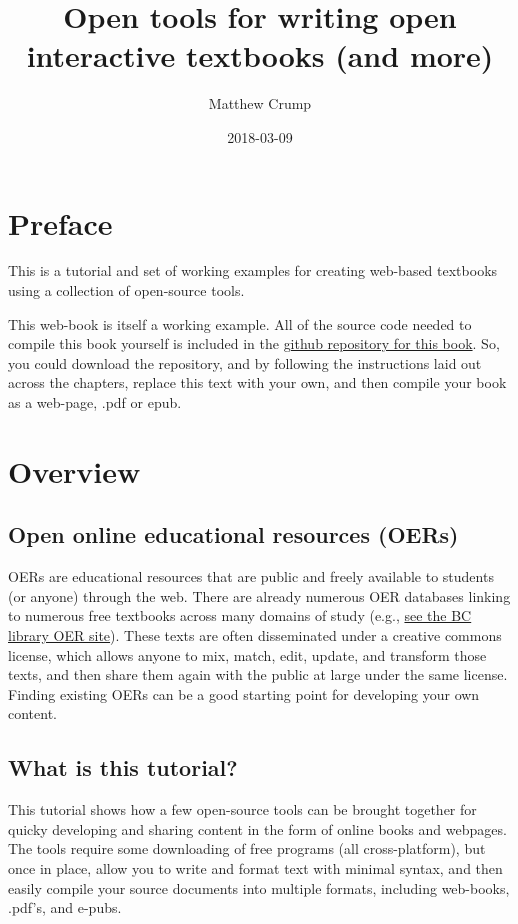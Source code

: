 \documentclass[]{book}
\title{Open tools for writing open interactive textbooks (and more)}
\author{Matthew Crump}
\date{2018-03-09}
\theoremstyle{definition}
\theoremstyle{definition}
\theoremstyle{definition}
\theoremstyle{remark}
\begin{document}
\maketitle

{
\setcounter{tocdepth}{1}
\tableofcontents
}
\chapter*{Preface}\label{preface}

This is a tutorial and set of working examples for creating web-based
textbooks using a collection of open-source tools.

This web-book is itself a working example. All of the source code needed
to compile this book yourself is included in the
\href{https://github.com/CrumpLab/OER_bookdown}{github repository for
this book}. So, you could download the repository, and by following the
instructions laid out across the chapters, replace this text with your
own, and then compile your book as a web-page, .pdf or epub.

\chapter{Overview}\label{overview}

\section{Open online educational resources
(OERs)}\label{open-online-educational-resources-oers}

OERs are educational resources that are public and freely available to
students (or anyone) through the web. There are already numerous OER
databases linking to numerous free textbooks across many domains of
study (e.g., \href{http://libguides.brooklyn.cuny.edu/research/oer}{see
the BC library OER site}). These texts are often disseminated under a
creative commons license, which allows anyone to mix, match, edit,
update, and transform those texts, and then share them again with the
public at large under the same license. Finding existing OERs can be a
good starting point for developing your own content.

\section{What is this tutorial?}\label{what-is-this-tutorial}

This tutorial shows how a few open-source tools can be brought together
for quicky developing and sharing content in the form of online books
and webpages. The tools require some downloading of free programs (all
cross-platform), but once in place, allow you to write and format text
with minimal syntax, and then easily compile your source documents into
multiple formats, including web-books, .pdf's, and e-pubs.
\end{document}
